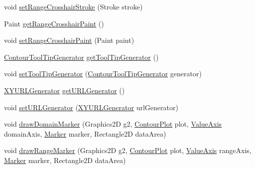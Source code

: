 \begin{DoxyCompactItemize}
\item 
void \mbox{\hyperlink{classorg_1_1jfree_1_1chart_1_1plot_1_1_contour_plot_a92b5bbd8ae6591b1815571e273504243}{set\+Range\+Crosshair\+Stroke}} (Stroke stroke)
\item 
Paint \mbox{\hyperlink{classorg_1_1jfree_1_1chart_1_1plot_1_1_contour_plot_a4ec8f4cbc567dde7f948756a1dcea7c8}{get\+Range\+Crosshair\+Paint}} ()
\item 
void \mbox{\hyperlink{classorg_1_1jfree_1_1chart_1_1plot_1_1_contour_plot_a25b1d562f04f63d4cd9941943872d20a}{set\+Range\+Crosshair\+Paint}} (Paint paint)
\item 
\mbox{\hyperlink{interfaceorg_1_1jfree_1_1chart_1_1labels_1_1_contour_tool_tip_generator}{Contour\+Tool\+Tip\+Generator}} \mbox{\hyperlink{classorg_1_1jfree_1_1chart_1_1plot_1_1_contour_plot_abdc3f251e4c985a412ef56ca81b8e510}{get\+Tool\+Tip\+Generator}} ()
\item 
void \mbox{\hyperlink{classorg_1_1jfree_1_1chart_1_1plot_1_1_contour_plot_afb3f6aeba081e0b5df934587c120edb5}{set\+Tool\+Tip\+Generator}} (\mbox{\hyperlink{interfaceorg_1_1jfree_1_1chart_1_1labels_1_1_contour_tool_tip_generator}{Contour\+Tool\+Tip\+Generator}} generator)
\item 
\mbox{\hyperlink{interfaceorg_1_1jfree_1_1chart_1_1urls_1_1_x_y_u_r_l_generator}{X\+Y\+U\+R\+L\+Generator}} \mbox{\hyperlink{classorg_1_1jfree_1_1chart_1_1plot_1_1_contour_plot_ab0a93262786bfcdcaa8ae3269b09927e}{get\+U\+R\+L\+Generator}} ()
\item 
void \mbox{\hyperlink{classorg_1_1jfree_1_1chart_1_1plot_1_1_contour_plot_af5675f151722ed575d30cb4ececb85a0}{set\+U\+R\+L\+Generator}} (\mbox{\hyperlink{interfaceorg_1_1jfree_1_1chart_1_1urls_1_1_x_y_u_r_l_generator}{X\+Y\+U\+R\+L\+Generator}} url\+Generator)
\item 
void \mbox{\hyperlink{classorg_1_1jfree_1_1chart_1_1plot_1_1_contour_plot_a2e741594ee7d9ab73b04e2f6a7b051b9}{draw\+Domain\+Marker}} (Graphics2D g2, \mbox{\hyperlink{classorg_1_1jfree_1_1chart_1_1plot_1_1_contour_plot}{Contour\+Plot}} plot, \mbox{\hyperlink{classorg_1_1jfree_1_1chart_1_1axis_1_1_value_axis}{Value\+Axis}} domain\+Axis, \mbox{\hyperlink{classorg_1_1jfree_1_1chart_1_1plot_1_1_marker}{Marker}} marker, Rectangle2D data\+Area)
\item 
void \mbox{\hyperlink{classorg_1_1jfree_1_1chart_1_1plot_1_1_contour_plot_a5a02cc3bae5dcc8e6856f45761d66461}{draw\+Range\+Marker}} (Graphics2D g2, \mbox{\hyperlink{classorg_1_1jfree_1_1chart_1_1plot_1_1_contour_plot}{Contour\+Plot}} plot, \mbox{\hyperlink{classorg_1_1jfree_1_1chart_1_1axis_1_1_value_axis}{Value\+Axis}} range\+Axis, \mbox{\hyperlink{classorg_1_1jfree_1_1chart_1_1plot_1_1_marker}{Marker}} marker, Rectangle2D data\+Area)

\end{DoxyCompactItemize}

